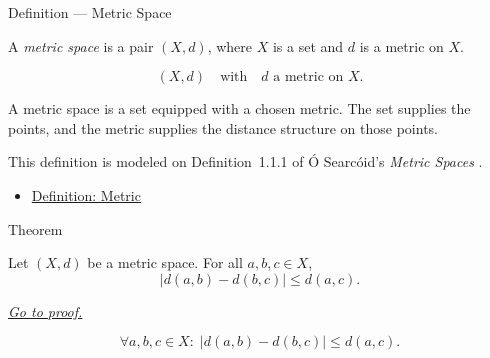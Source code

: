 \begin{definitionbox}{Definition --- Metric Space}
\begin{definition}\label{def:metric-space}
A \emph{metric space} is a pair \((X,d)\), where \(X\) is a set and \(d\) is
a metric on \(X\).
\end{definition}
\end{definitionbox}

\begin{remark*}
\[
(X,d)
\quad\text{with}\quad
d \text{ a metric on } X.
\]
\end{remark*}

\begin{remark*}[Interpretation]
A metric space is a set equipped with a chosen metric.  The set supplies the
points, and the metric supplies the distance structure on those points.
\end{remark*}

\begin{remark*}
This definition is modeled on Definition~1.1.1 of
{\'O} Searc{\'o}id's \emph{Metric Spaces} \cite{OSearcoidMetricSpaces}.
\end{remark*}


\begin{dependencies}
\begin{itemize}
  \item \hyperref[def:metric-on-set]{Definition: Metric}
\end{itemize}
\end{dependencies}

\begin{theorembox}{Theorem}
\begin{theorem}
\label{thm:metric-rearranged-triangle-inequality}
Let \((X,d)\) be a metric space.  For all \(a,b,c\in X\),
\[
  \bigl|d(a,b)-d(b,c)\bigr|\leq d(a,c).
\]

\smallskip
\noindent
\hyperref[prf:metric-rearranged-triangle-inequality]{\textit{Go to proof.}}
\end{theorem}
\end{theorembox}

\begin{remark*}
\[
\forall a,b,c\in X{:}\;
\bigl|d(a,b)-d(b,c)\bigr|\leq d(a,c).
\]
\end{remark*}


